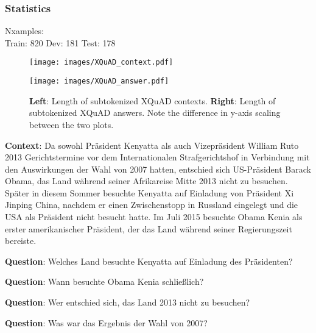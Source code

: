 \cite{artetxe2019cross}

\subsubsection{Statistics}

Nxamples: \\
Train: 820
Dev: 181
Test: 178


\begin{figure}
  \begin{minipage}{0.45\linewidth}
  \vspace{0pt}
    \texttt{[image: images/XQuAD\_context.pdf]}
  \end{minipage}
  \hfill
  \begin{minipage}{0.45\linewidth}
  \vspace{0pt}
    \texttt{[image: images/XQuAD\_answer.pdf]}
  \end{minipage}
  \caption[XQuAD Lengths]{\textbf{Left}: Length of subtokenized XQuAD contexts.
                         \textbf{Right}: Length of subtokenized XQuAD answers. Note the difference in y-axis scaling between the two plots.}
\end{figure}

\begin{examples}
  \item \label{itm:xquad} \textbf{Context}: Da sowohl Präsident Kenyatta als auch Vizepräsident William Ruto
        2013 Gerichtstermine vor dem Internationalen Strafgerichtshof in Verbindung mit den
        Auswirkungen der Wahl von 2007 hatten, entschied sich US-Präsident Barack Obama,
        das Land während seiner Afrikareise Mitte 2013 nicht zu besuchen. Später in diesem
        Sommer besuchte Kenyatta auf Einladung von Präsident Xi Jinping China, nachdem er
        einen Zwischenstopp in Russland eingelegt und die USA als Präsident nicht besucht
        hatte. Im Juli 2015 besuchte Obama Kenia als erster amerikanischer Präsident, der
        das Land während seiner Regierungszeit bereiste.

        \textbf{Question}: Welches Land besuchte Kenyatta auf Einladung des Präsidenten?

        \textbf{Question}: Wann besuchte Obama Kenia schließlich?

        \textbf{Question}: Wer entschied sich, das Land 2013 nicht zu besuchen?

        \textbf{Question}: Was war das Ergebnis der Wahl von 2007?
\end{examples}

